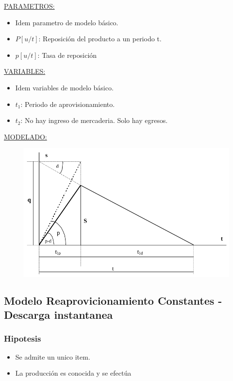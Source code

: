 \documentclass{article}
\begin{document}
\noindent
\underline{PARAMETROS:}
\begin{itemize}
    \item Idem parametro de modelo básico.
    \item \(P[u/t]\): Reposición del producto a un periodo t. 
    \item \(p[u/t]\): Tasa de reposición
\end{itemize}


\noindent
\underline{VARIABLES:}
\begin{itemize}
    \item Idem variables de modelo básico.
    \item \(t_1\): Periodo de aprovisionamiento.
    \item \(t_2\): No hay ingreso de mercaderia. Solo hay egresos.
\end{itemize}


\noindent
\underline{MODELADO:}

\begin{figure}[h!]
    \includegraphics[width=\linewidth]{imagenes/stock-modelo-no-instantaneo.png}
\end{figure}





\subsection{Modelo Reaprovicionamiento Constantes - Descarga instantanea}

\subsubsection{Hipotesis}
\begin{itemize}
    \item Se admite un unico item.
    \item La producción es conocida y se efectúa
\end{itemize}
\end{document}
